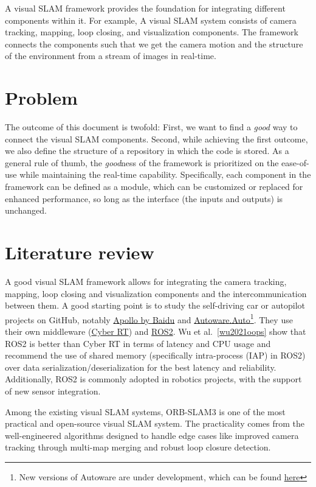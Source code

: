 A visual SLAM framework provides the foundation for integrating different components within it. 
For example, A visual SLAM system consists of camera tracking, mapping, loop closing, and visualization components. The framework connects the components such that we get the camera motion and the structure of the environment from a stream of images in real-time.


\section{Problem}

The outcome of this document is twofold: 
First, we want to find a \textit{good} way to connect the visual SLAM components. 
Second, while achieving the first outcome, we also define the structure of a repository in which the code is stored.
As a general rule of thumb, the \textit{good}ness of the framework is prioritized on the ease-of-use while maintaining the real-time capability.
Specifically, each component in the framework can be defined as a module, which can be customized or replaced for enhanced performance, so long as the interface (the inputs and outputs) is unchanged.

\section{Literature review}

A good visual SLAM framework allows for integrating the camera tracking, mapping, loop closing and visualization components and the intercommunication between them.
A good starting point is to study the self-driving car or autopilot projects on GitHub, notably \href{https://github.com/ApolloAuto/apollo}{Apollo by Baidu} and \href{https://gitlab.com/autowarefoundation/autoware.auto/AutowareAuto}{Autoware.Auto}\footnote{New versions of Autoware are under development, which can be found \href{https://github.com/autowarefoundation/autoware}{here}}.
They use their own middleware (\href{https://cyber-rt.readthedocs.io/en/latest/index.html}{Cyber RT}) and \href{https://docs.ros.org/en/humble/}{ROS2}. 
Wu et al.~\ref{wu2021oops} show that ROS2 is better than Cyber RT in terms of latency and CPU usage and recommend the use of shared memory (specifically intra-process (IAP) in ROS2) over data serialization/deserialization for the best latency and reliability.
Additionally, ROS2 is commonly adopted in robotics projects, with the support of new sensor integration. 

Among the existing visual SLAM systems, ORB-SLAM3 is one of the most practical and open-source visual SLAM system.
The practicality comes from the well-engineered algorithms designed to handle edge cases like improved camera tracking through multi-map merging and robust loop closure detection.

